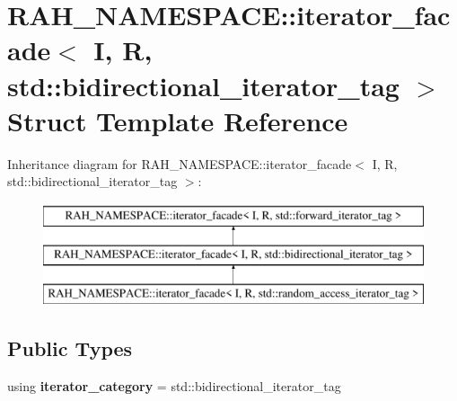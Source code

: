 \hypertarget{struct_r_a_h___n_a_m_e_s_p_a_c_e_1_1iterator__facade_3_01_i_00_01_r_00_01std_1_1bidirectional__iterator__tag_01_4}{}\section{R\+A\+H\+\_\+\+N\+A\+M\+E\+S\+P\+A\+CE\+::iterator\+\_\+facade$<$ I, R, std\+::bidirectional\+\_\+iterator\+\_\+tag $>$ Struct Template Reference}
\label{struct_r_a_h___n_a_m_e_s_p_a_c_e_1_1iterator__facade_3_01_i_00_01_r_00_01std_1_1bidirectional__iterator__tag_01_4}
Inheritance diagram for R\+A\+H\+\_\+\+N\+A\+M\+E\+S\+P\+A\+CE\+::iterator\+\_\+facade$<$ I, R, std\+::bidirectional\+\_\+iterator\+\_\+tag $>$\+:\begin{figure}[H]
\begin{center}
\leavevmode
\includegraphics[height=3.000000cm]{struct_r_a_h___n_a_m_e_s_p_a_c_e_1_1iterator__facade_3_01_i_00_01_r_00_01std_1_1bidirectional__iterator__tag_01_4}
\end{center}
\end{figure}
\subsection*{Public Types}
\begin{DoxyCompactItemize}
\item 
\mbox{\label{struct_r_a_h___n_a_m_e_s_p_a_c_e_1_1iterator__facade_3_01_i_00_01_r_00_01std_1_1bidirectional__iterator__tag_01_4_a4a4bb5297faa1c67244e7d36fffb8065}} 
using {\bfseries iterator\+\_\+category} = std\+::bidirectional\+\_\+iterator\+\_\+tag
\end{DoxyCompactItemize}
